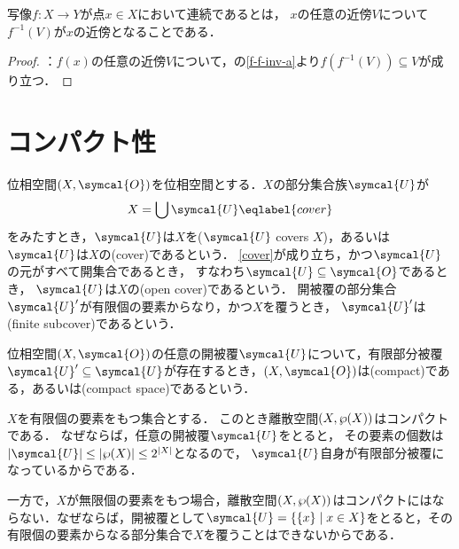 \documentclass{ltjsbook}
\begin{document}
\begin{thmbox}
\begin{proposition}
写像\(f\colon X \to Y\)が点\(x \in X\)において連続であるとは，
\(x\)の任意の近傍\(V\)について\(f^{-1}(V)\)が\(x\)の近傍となることである．
\end{proposition}
\end{thmbox}

\begin{proof}
：\(f(x)\)の任意の近傍\(V\)について，の\ref{f-f-inv-a}より\(f(f^{-1}(V)) \subseteq V\)が成り立つ．
\end{proof}


\section{コンパクト性}
\begin{thmbox}
\begin{definition}
    位相空間\(\tuple{X, \symcal{O}}\)を位相空間とする．\(X\)の部分集合族\(\symcal{U}\)が
\begin{align}
    X = \bigcup \symcal{U}
    \eqlabel{cover}
\end{align}
をみたすとき，\(\symcal{U}\)は\(X\)を(\(\symcal{U}\) covers \(X\))，あるいは
\(\symcal{U}\)は\(X\)の(cover)であるという．
\eqref{cover}が成り立ち，かつ\(\symcal{U}\)の元がすべて開集合であるとき，
すなわち\(\symcal{U} \subseteq \symcal{O}\)であるとき，
\(\symcal{U}\)は\(X\)の(open cover)であるという．
開被覆の部分集合\(\symcal{U}'\)が有限個の要素からなり，かつ\(X\)を覆うとき，
\(\symcal{U}'\)は(finite subcover)であるという．

位相空間\(\tuple{X, \symcal{O}}\)の任意の開被覆\(\symcal{U}\)について，有限部分被覆\(\symcal{U}' \subseteq \symcal{U}\)が存在するとき，\(\tuple{X, \symcal{O}}\)は(compact)である，あるいは(compact space)であるという．
\end{definition}
\end{thmbox}

\begin{exa} \(X\)を有限個の要素をもつ集合とする．
このとき離散空間\((X, \wp(X))\)はコンパクトである．
なぜならば，任意の開被覆\(\symcal{U}\)をとると，
その要素の個数は\(\lvert\symcal{U}\rvert \leq \lvert \wp(X)\rvert \leq 2^{\lvert X \rvert}\)となるので，
\(\symcal{U}\)自身が有限部分被覆になっているからである．

一方で，\(X\)が無限個の要素をもつ場合，離散空間\((X, \wp(X))\)はコンパクトにはならない．なぜならば，開被覆として\(\symcal{U} = \{\{x\} \mid x \in X\}\)をとると，その有限個の要素からなる部分集合で\(X\)を覆うことはできないからである．
\end{exa}
\end{document}

